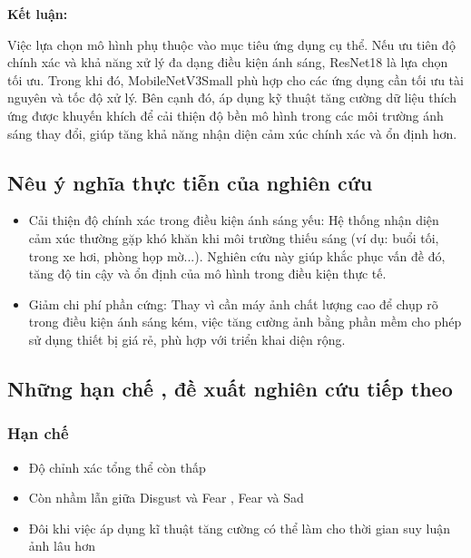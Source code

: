 \textbf{Kết luận:} 

Việc lựa chọn mô hình phụ thuộc vào mục tiêu ứng dụng cụ thể. Nếu ưu tiên độ chính xác và khả năng xử lý đa dạng điều kiện ánh sáng, ResNet18 là lựa chọn tối ưu. Trong khi đó, MobileNetV3Small phù hợp cho các ứng dụng cần tối ưu tài nguyên và tốc độ xử lý. Bên cạnh đó, áp dụng kỹ thuật tăng cường dữ liệu thích ứng được khuyến khích để cải thiện độ bền mô hình trong các môi trường ánh sáng thay đổi, giúp tăng khả năng nhận diện cảm xúc chính xác và ổn định hơn.




\subsection{Nêu ý nghĩa thực tiễn của nghiên cứu}
\begin{itemize}
    \item Cải thiện độ chính xác trong điều kiện ánh sáng yếu: Hệ thống nhận diện cảm xúc thường gặp khó khăn khi môi trường thiếu sáng (ví dụ: buổi tối, trong xe hơi, phòng họp mờ...). Nghiên cứu này giúp khắc phục vấn đề đó, tăng độ tin cậy và ổn định của mô hình trong điều kiện thực tế.
    \item Giảm chi phí phần cứng: Thay vì cần máy ảnh chất lượng cao để chụp rõ trong điều kiện ánh sáng kém, việc tăng cường ảnh bằng phần mềm cho phép sử dụng thiết bị giá rẻ, phù hợp với triển khai diện rộng.
\end{itemize}

\subsection{Những hạn chế , đề xuất nghiên cứu tiếp theo}

\subsubsection{Hạn chế}
\begin{itemize}
    \item Độ chỉnh xác tổng thể còn thấp
    \item Còn nhầm lẫn giữa Disgust và Fear , Fear và Sad
    \item Đôi khi việc áp dụng kĩ thuật tăng cường có thể làm cho thời gian suy luận ảnh lâu hơn
\end{itemize}

